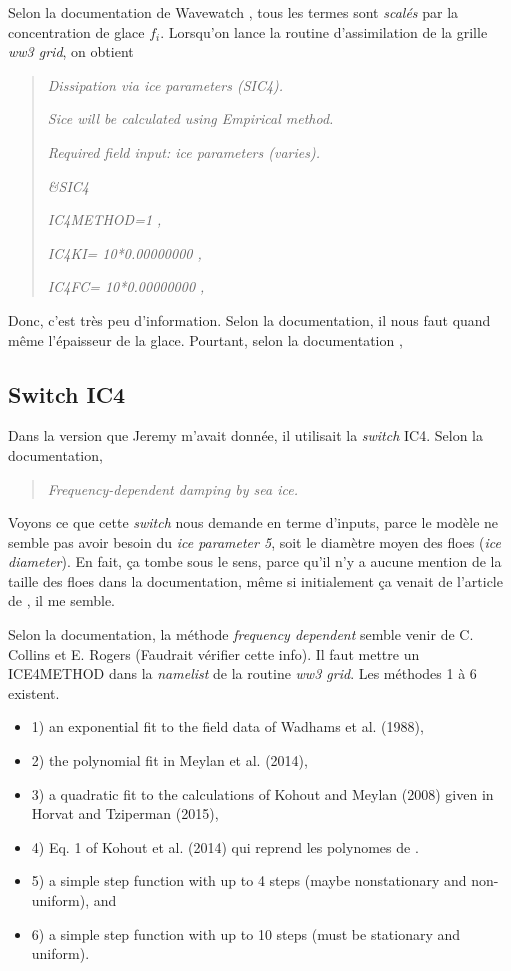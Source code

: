 \documentclass[10pt]{article}
\numberwithin{equation}{section}
\begin{document}
Selon la documentation de Wavewatch \autocite[p.16]{wwiii2016user}, tous les termes sont \emph{scalés} par la concentration de glace \(f_i\). Lorsqu'on lance la routine d'assimilation de la grille \emph{ww3 grid}, on obtient

\begin{quote}
\emph{Dissipation via ice parameters (SIC4).}

\emph{Sice will be calculated using Empirical method.}

\emph{Required field input: ice parameters (varies).}

\emph{\&SIC4}

\emph{IC4METHOD=1          ,}

\emph{IC4KI= 10*0.00000000      ,}

\emph{IC4FC= 10*0.00000000      ,}
\end{quote}

Donc, c'est très peu d'information. Selon la documentation, il nous faut quand même l'épaisseur de la glace. Pourtant, selon la documentation \autocite{wwiii2016user}, 
\subsection{Switch IC4}
\label{sec:org46e973d}

Dans la version que Jeremy m'avait donnée, il utilisait la \emph{switch} IC4. Selon la documentation,

\begin{quote}
\emph{Frequency-dependent damping by sea ice.}
\end{quote}

Voyons ce que cette \emph{switch} nous demande en terme d'inputs, parce le modèle ne semble pas avoir besoin du \emph{ice parameter 5}, soit le diamètre moyen des floes (\emph{ice diameter}). En fait, ça tombe sous le sens, parce qu'il n'y a aucune mention de la taille des floes dans la documentation, même si initialement ça venait de l'article de \Textcite{kohout2008elastic}, il me semble. \medskip

Selon la documentation, la méthode \emph{frequency dependent} semble venir de C. Collins et E. Rogers (Faudrait vérifier cette info). Il faut mettre un ICE4METHOD dans la \emph{namelist} de la routine \emph{ww3 grid}. Les méthodes 1 à 6 existent.
\begin{itemize}
\item 1) an exponential fit to the field data of Wadhams et al. (1988),
\item 2) the polynomial fit in Meylan et al. (2014),
\item 3) a quadratic fit to the calculations of Kohout and Meylan (2008) given in Horvat and Tziperman (2015),
\item 4) Eq. 1 of Kohout et al. (2014) qui reprend les polynomes de \Textcite{kohout2008elastic}.
\item 5) a simple step function with up to 4 steps (maybe nonstationary and non-uniform), and
\item 6) a simple step function with up to 10 steps (must be stationary and uniform).
\end{itemize}
\end{document}
